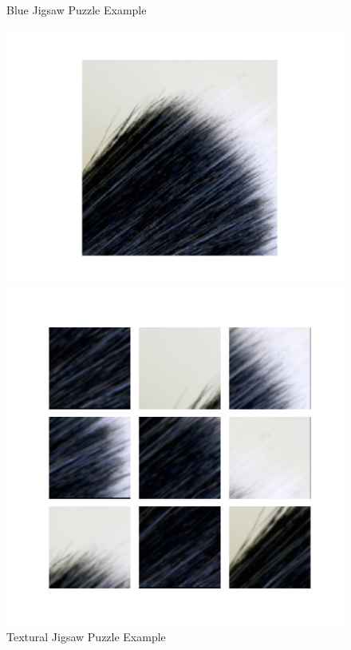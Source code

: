 \documentclass{article}
\begin{document}
\begin{figure}
\begin{minipage}{\textwidth}
\begin{minipage}{.49\textwidth}
\begin{minipage}{.49\textwidth}
            \end{minipage}
            \caption{Blue Jigsaw Puzzle Example}
            \label{fig:bluejigsawpuzzle}
        \end{minipage}
        \begin{minipage}{.49\textwidth}
            \begin{minipage}{.49\textwidth}
                \centering
                \includegraphics[width=\textwidth]{origin_texure}
            \end{minipage}
            \begin{minipage}{.49\textwidth}
                \centering
                \includegraphics[width=\textwidth]{puzzle_texure}
            \end{minipage}
            \caption{Textural Jigsaw Puzzle Example}
            \label{fig:texurejigsawpuzzle}
        \end{minipage}
    \end{minipage}
\end{figure}
\end{document}
